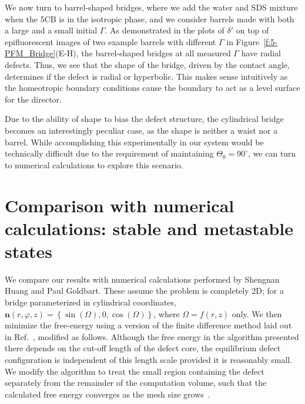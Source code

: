 We now turn to barrel-shaped bridges, where we add the water and SDS mixture when the 5CB is in the isotropic phase, and we consider barrels made with both a large and a small initial $\Gamma$.
As demonstrated in the plots of $\delta'$ on top of epifluorescent images of two example barrels with different $\Gamma$ in Figure~\ref{f:5-PFM_Bridge}(E-H), the barrel-shaped bridges at all measured $\Gamma$ have radial defects.
Thus, we see that the shape of the bridge, driven by the contact angle, determines if the defect is radial or hyperbolic.
This makes sense intuitively as the homeotropic boundary conditions cause the boundary to act as a level surface for the director.

Due to the ability of shape to bias the defect structure, the cylindrical bridge becomes an interestingly peculiar case, as the shape is neither a waist nor a barrel.
While accomplishing this experimentally in our system would be technically difficult due to the requirement of maintaining $\Theta_0 = 90^{\circ}$, we can turn to numerical calculations to explore this scenario.




\section{Comparison with numerical calculations: stable and metastable states}
We compare our results with numerical calculations performed by Shengnan Huang and Paul Goldbart.
These assume the problem is completely 2D; for a bridge parameterized in cylindrical coordinates, $\mathbf{n}(r,\varphi,z) = \left \{ \sin(\Omega), 0, \cos(\Omega)   \right \}$, where $\Omega = f(r,z)$ only.
We then minimize the free-energy using a version of the finite difference method laid out in Ref.~\cite{RN144}, modified as follows.
Although the free energy in the algorithm presented there depends on the cut-off length of the defect core, the equilibrium defect configuration is independent of this length scale provided it is reasonably small.
We modify the algorithm to treat the small region containing the defect separately from the remainder of the computation volume, such that the calculated free energy converges as the mesh size grows~\cite{RN199,RN200,RN201}.

